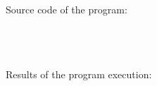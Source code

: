 \documentclass{article}
\begin{document}
\paragraph{}\
Source code of the program:

\begin{verbatim}
\end{verbatim}

\paragraph{}\
\paragraph{}\
	Results of the program execution:
	
\begin{verbatim} 
\end{verbatim}

\paragraph{}\
\paragraph{}\
\end{document}
